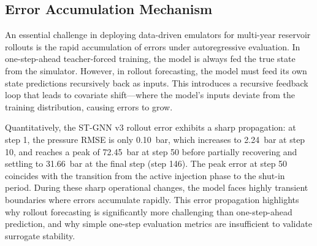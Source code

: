 \subsection{Error Accumulation Mechanism}
An essential challenge in deploying data-driven emulators for multi-year reservoir rollouts is the rapid accumulation of errors under autoregressive evaluation. In one-step-ahead teacher-forced training, the model is always fed the true state from the simulator. However, in rollout forecasting, the model must feed its own state predictions recursively back as inputs. This introduces a recursive feedback loop that leads to covariate shift—where the model's inputs deviate from the training distribution, causing errors to grow.

Quantitatively, the ST-GNN v3 rollout error exhibits a sharp propagation: at step 1, the pressure RMSE is only 0.10~bar, which increases to 2.24~bar at step 10, and reaches a peak of 72.45~bar at step 50 before partially recovering and settling to 31.66~bar at the final step (step 146). The peak error at step 50 coincides with the transition from the active injection phase to the shut-in period. During these sharp operational changes, the model faces highly transient boundaries where errors accumulate rapidly. This error propagation highlights why rollout forecasting is significantly more challenging than one-step-ahead prediction, and why simple one-step evaluation metrics are insufficient to validate surrogate stability.


